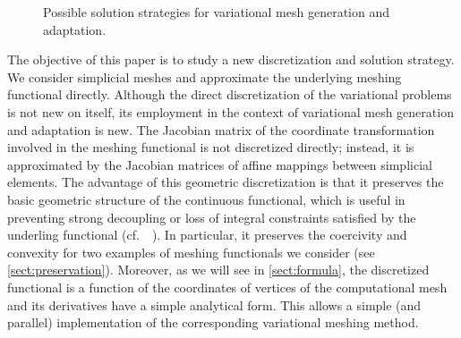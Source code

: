 \documentclass[american]{scrartcl}
\providecommand{\acite}[1]{\citeauthor{#1}~\cite{#1}}
\providecommand{\V}[1]{\boldsymbol{#1}}
\theoremstyle{remark}
\begin{document}
\begin{figure}
   \caption{      Possible solution strategies for variational mesh generation and adaptation.   }\label{fig:solution:strategies}
\end{figure}

The objective of this paper is to study a new discretization and solution strategy.
We consider simplicial meshes and approximate the underlying meshing functional directly.
Although the direct discretization of the variational problems is not new on itself, its employment in the context of variational mesh generation and adaptation is new.
The Jacobian matrix of the coordinate transformation involved in the meshing functional is not discretized directly; instead, it is approximated by the Jacobian matrices of affine mappings between simplicial elements.
The advantage of this geometric discretization is that it preserves the basic geometric structure of the continuous functional, which is useful in preventing strong decoupling or loss of integral constraints satisfied by the underling functional (cf.~\acite{Cas86}).
In particular, it preserves the coercivity and convexity for two examples of meshing functionals we consider (see \cref{sect:preservation}).
Moreover, as we will see in \cref{sect:formula}, the discretized functional is a function of the coordinates of vertices of the computational mesh and its derivatives have a simple analytical form.
This allows a simple (and parallel) implementation of the corresponding variational meshing method.
\end{document}
